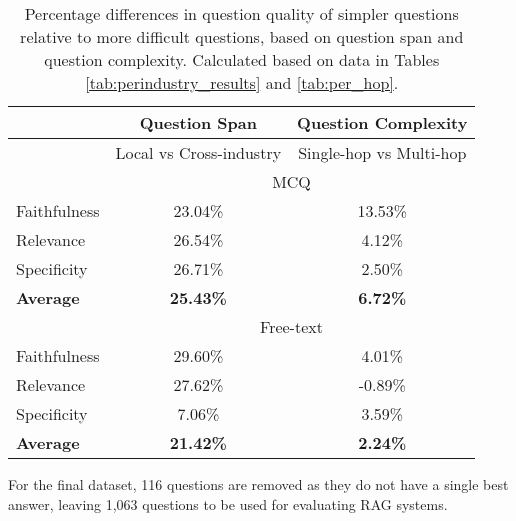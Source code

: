 \begin{table}[H]
\centering
\begin{tabular}{lcc}
\hline
             & Question Span           & Question Complexity     \\ \hline
             & Local vs Cross-industry & Single-hop vs Multi-hop \\ \cline{2-3} 
             & \multicolumn{2}{c}{MCQ}                           \\ \cline{2-3} 
Faithfulness & 23.04\%                 & 13.53\%                 \\
Relevance    & 26.54\%                 & 4.12\%                  \\
Specificity  & 26.71\%                 & 2.50\%                  \\
\textbf{Average}      & \textbf{25.43\% }                &\textbf{ 6.72\%}                  \\ \cline{2-3} 
             & \multicolumn{2}{c}{Free-text}                     \\ \cline{2-3} 
Faithfulness & 29.60\%                 & 4.01\%                  \\
Relevance    & 27.62\%                 & -0.89\%                 \\
Specificity  & 7.06\%                  & 3.59\%                  \\
\textbf{Average}      & \textbf{21.42\% }                & \textbf{2.24\%}                  \\ \hline
\end{tabular}
\caption{Percentage differences in question quality of simpler questions relative to more difficult questions, based on question span and question complexity. Calculated based on data in Tables \ref{tab:perindustry_results} and \ref{tab:per_hop}.}
\label{tab:final_ablation}
\end{table}

For the final dataset, 116 questions are removed as they do not have a single best answer, leaving 1,063 questions to be used for evaluating RAG systems.
